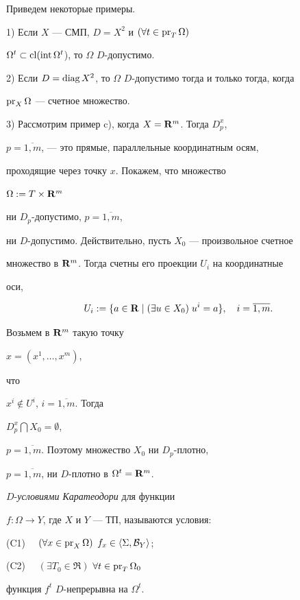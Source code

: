Приведем некоторые примеры.





1) Если $X$ --- СМП, $D=X^2$ и $(\forall t\in\operatorname{pr}_T\Omega)$\;


$\Omega^t\subset\operatorname{cl}(\operatorname{int}\Omega^t$), то $\Omega$ \; $D$-допустимо.





2) Если $D=\operatorname{diag} X^2$, то $\Omega$ \; $D$-допустимо тогда и только тогда, когда


$\operatorname{pr}_X\Omega$ --- счетное множество.





3) Рассмотрим пример c), когда $X={\bold R}^m$. Тогда $D_p^x$,


$p=\overline{1,m}$, --- это прямые, параллельные координатным осям,


проходящие через точку $x$. Покажем, что множество


$\Omega := T\times\bold R^m$


ни $D_p$-допустимо, $p=\overline{1,m}$,


ни $D$-допустимо. Действительно, пусть $X_0$ --- произвольное счетное


множество в $\bold{R}^m$. Тогда счетны его проекции $U_i$ на координатные


оси,


$$


U_i := \{a\in \bold R \mid (\exists u\in X_0)\; u^i=a \},


\quad i=\overline{1,m}.


$$


Возьмем в $\bold R ^m$ такую точку


$x=(x^1,\dotsc,x^m)$,


что


$x^i\notin U^i$, $i=\overline{1,m}$. Тогда


$D_p^x\bigcap X_0=\emptyset$,


$p=\overline{1,m}$. Поэтому множество $X_0$ ни $D_p$-плотно,


$p=\overline{1,m}$, ни $D$-плотно в $\Omega ^t=\bold R ^m$.





\begin{defns} $D$-{\em условиями Каратеодори} для функции


$f:\Omega\to Y$, где $X$ и $Y$ --- ТП, называются условия:





(C1) $\quad (\forall x\in\operatorname{pr}_X\Omega)$ \; $f_x\in\langle \Sigma ,{\cal B}_Y\rangle $;





(C2) $\quad (\exists T_0\in\Re)$ \; $\forall t\in\operatorname{pr}_T\Omega _0\;$


функция $f^t$ \; $D$-непрерывна на $\Omega^t$.


\end{defns}





